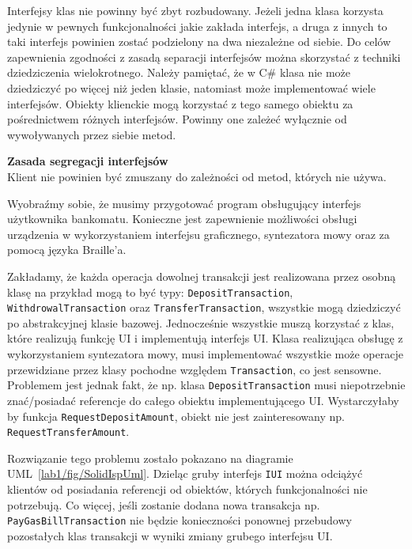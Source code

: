 Interfejsy klas nie powinny być zbyt rozbudowany. Jeżeli jedna klasa korzysta jedynie w pewnych funkcjonalności jakie zakłada interfejs, a druga z innych to taki interfejs powinien zostać podzielony na dwa niezależne od siebie. Do celów zapewnienia zgodności z zasadą separacji interfejsów można skorzystać z techniki dziedziczenia wielokrotnego. Należy pamiętać, że w C\# klasa nie może dziedziczyć po więcej niż jeden klasie, natomiast może implementować wiele interfejsów. Obiekty klienckie mogą korzystać z tego samego obiektu za pośrednictwem różnych interfejsów. Powinny one zależeć wyłącznie od wywoływanych przez siebie metod.  

\begin{tcolorbox}[colback=yellow]	
	\textbf{Zasada segregacji interfejsów}\\
	Klient nie powinien być zmuszany do zależności od metod, których nie używa.
\end{tcolorbox}


Wyobraźmy sobie, że musimy przygotować program obsługujący interfejs użytkownika bankomatu. Konieczne jest zapewnienie możliwości obsługi urządzenia w wykorzystaniem interfejsu graficznego, syntezatora mowy oraz za pomocą języka Braille'a. 

Zakładamy, że każda operacja dowolnej transakcji jest realizowana przez osobną klasę na przykład mogą to być typy: \texttt{DepositTransaction}, \texttt{WithdrowalTransaction} oraz \texttt{TransferTransaction}, wszystkie mogą dziedziczyć po abstrakcyjnej klasie bazowej. Jednocześnie wszystkie muszą korzystać z klas, które realizują funkcję UI i implementują interfejs UI. Klasa realizująca obsługę z wykorzystaniem syntezatora mowy, musi implementować wszystkie może operacje przewidziane przez klasy pochodne względem \texttt{Transaction}, co jest sensowne. Problemem jest jednak fakt, że np. klasa \texttt{DepositTransaction} musi niepotrzebnie znać/posiadać referencje do całego obiektu implementującego UI. Wystarczyłaby by funkcja \texttt{RequestDepositAmount}, obiekt nie jest zainteresowany np. \texttt{RequestTransferAmount}. 

Rozwiązanie tego problemu zostało pokazano na diagramie UML~\ref{lab1/fig/SolidIspUml}. Dzieląc gruby interfejs \texttt{IUI} można odciążyć klientów od posiadania referencji od obiektów, których funkcjonalności nie potrzebują. Co więcej, jeśli zostanie dodana nowa transakcja np. \texttt{PayGasBillTransaction} nie będzie konieczności ponownej przebudowy pozostałych klas transakcji w wyniki zmiany grubego interfejsu UI. 

